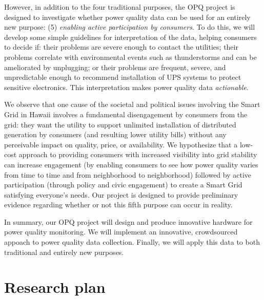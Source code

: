 \documentclass[11pt]{article}
\begin{document}
However, in addition to the four traditional purposes, the OPQ project is designed to investigate whether power quality data can be used for an entirely new purpose: (5) {\em enabling active participation by consumers}. To do this, we will develop some simple guidelines for interpretation of the data, helping consumers to decide if: their problems are severe enough to contact the utilities; their problems correlate with environmental events such as thunderstorms and can be ameliorated by unplugging; or their problems are frequent, severe, and unpredictable enough to recommend installation of UPS systems to protect sensitive electronics.  This interpretation makes power quality data {\em actionable}.

We observe that one cause of the societal and political issues involving the Smart Grid in Hawaii involves a fundamental disengagement by consumers from the grid: they want the utility to support unlimited installation of distributed generation by consumers (and resulting lower utility bills) without any perceivable impact on quality, price, or availability.  We hypothesize that a low-cost approach to providing consumers with increased visibility into grid stability can increase engagement (by enabling consumers to see how power quality varies from time to time and from neighborhood to neighborhood) followed by active participation (through policy and civic engagement) to create a Smart Grid satisfying everyone's needs.  Our project is designed to provide preliminary evidence regarding whether or not this fifth purpose can occur in reality.

In summary, our OPQ project will design and produce innovative hardware for power quality monitoring. We will implement an innovative, crowdsourced appoach to power quality data collection. Finally, we will apply this data to both traditional and entirely new purposes.   


\section{Research plan}
\end{document}
